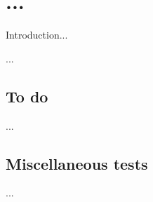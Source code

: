 \chapter{...}
\label{ch:...}
\localtableofcontents
Introduction...

...
\begin{devMan}
\section{To do}
...
\section{Miscellaneous tests}

...
\end{devMan}
